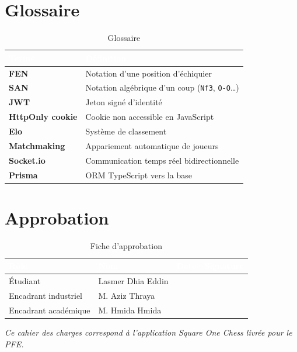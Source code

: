 \documentclass[12pt,a4paper,oneside]{article}
\newcommand{\StudentName}{Lasmer Dhia Eddin}
\newcommand{\SupervisorName}{M. Aziz Thraya}
\newcommand{\AcademicSupervisor}{M. Hmida Hmida}
\begin{document}
\section{Glossaire}

\begin{table}[H]
\centering
\caption{Glossaire}
\begin{tabularx}{\linewidth}{|>{\bfseries}l|X|}
\hline
\rowcolor{sectionblue}
\textcolor{white}{Terme} & \textcolor{white}{\textbf{Définition}} \\
\hline
FEN & Notation d'une position d'échiquier \\
\hline
SAN & Notation algébrique d'un coup (\texttt{Nf3}, \texttt{O-O}\ldots) \\
\hline
JWT & Jeton signé d'identité \\
\hline
HttpOnly cookie & Cookie non accessible en JavaScript \\
\hline
Elo & Système de classement \\
\hline
Matchmaking & Appariement automatique de joueurs \\
\hline
Socket.io & Communication temps réel bidirectionnelle \\
\hline
Prisma & ORM TypeScript vers la base \\
\hline
\end{tabularx}
\end{table}

\section{Approbation}

\begin{table}[H]
\centering
\caption{Fiche d'approbation}
\begin{tabularx}{\linewidth}{|X|X|c|c|}
\hline
\rowcolor{sectionblue}
\textcolor{white}{\textbf{Rôle}} & \textcolor{white}{\textbf{Nom}} & \textcolor{white}{\textbf{Date}} & \textcolor{white}{\textbf{Signature}} \\
\hline
Étudiant & \StudentName & & \\[2.2em]
\hline
Encadrant industriel & \SupervisorName & & \\[2.2em]
\hline
Encadrant académique & \AcademicSupervisor & & \\[2.2em]
\hline
\end{tabularx}
\end{table}

\vfill
\begin{center}
\textit{Ce cahier des charges correspond à l'application Square One Chess livrée pour le PFE.}
\end{center}
\end{document}
